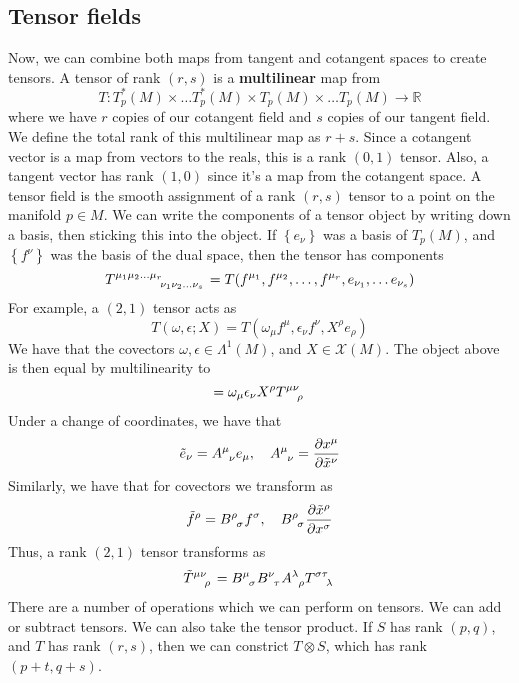 \documentclass[11pt, a4paper]{article}   	%
\theoremstyle{slplain}
\begin{document}
\subsection{Tensor fields} 
Now, we can combine both maps from tangent and cotangent spaces to create tensors. 
A tensor of rank $( r, s) $ is a \textbf{multilinear} map from 
\[
T: T_p^* ( M ) \times \dots T_p^*( M )  \times T_p(M) \times \dots T_p( M) \to  \mathbb{ R}  
\] where we have $r  $ copies of our cotangent field and $ s$ copies of our tangent field. 
We define the total rank of this multilinear map as $ r + s$. 
Since a cotangent vector is a map from vectors to the reals, 
this is a rank  $ ( 0, 1 ) $ tensor. 
Also, a tangent vector has rank $ ( 1, 0 ) $ since it's a map from the
cotangent space. 
A tensor field is the smooth assignment of a rank $ ( r, s) $ tensor to a point
on the manifold $ p \in M $. 
We can write the components of a tensor object 
by writing down a basis, then sticking this into the object. 
If $ \left\{  e_\nu \right\} $ was a basis of $ T_{p }( M ) $, and 
$ \left\{  f^\nu \right\} $ was the basis of the dual space, then 
the tensor has components 
\[
T \indices{^{\mu_1 } ^{\mu_2} ^{\dots } ^{\mu_r}_{\nu_1 }_{\nu_2 } _{\dots }_{\nu_s}} = T(f^{\mu_1 }, f^{\mu_2}, \dots, f^{\mu_r}, e_{\nu_1 }, \dots e_{\nu_s} )  
\]
For example, a $ ( 2 , 1) $ tensor acts as 
\[
T ( \omega , \epsilon; X) = T ( \omega_{\mu } f^\mu, \epsilon_{ \nu }f^\nu, X^\rho e_{ \rho }) 
\] We have that the covectors $ \omega  , \epsilon \in \Lambda^ 1 ( M ) $, and $  X\in \mathcal{ X }( M ) $. 
The object above is then equal by multilinearity to 
\[
= \omega _{ \mu } \epsilon_{\nu } X^\rho T \indices{ ^\mu ^ \nu _\rho }  
\] Under a change of coordinates, we have that 
\[
\tilde{ e}_{ \nu } = A \indices{^\mu _ \nu } e_{ \mu }, \quad A \indices{ ^ \mu _ \nu } = \frac{\partial  x^\mu }{\partial \tilde{ x}^\nu}   
\] 
Similarly, we have that for covectors we transform as 
\[
\tilde{ f} ^\rho = B \indices{ ^\rho _\sigma } f^\sigma, \quad B \indices{ ^\rho _\sigma } \frac{\partial  \tilde{ x}^\rho}{\partial x^\sigma}    
\] Thus, a rank $ ( 2, 1 ) $ tensor transforms as 
\[
\tilde{ T } \indices{^\mu^\nu_\rho}  = B \indices{^\mu_\sigma } B \indices{^\nu _\tau} A \indices{^\lambda _\rho} T \indices{^\sigma ^\tau _ \lambda}     
\] There are a number of operations which we can perform on tensors. 
We can add or subtract tensors. We can also take the tensor product. 
If $ S $ has rank $ ( p , q) $, and $  T $ has rank $ ( r, s ) $, then 
we can constrict $ T \otimes S $, which has rank $ ( p + t , q + s ) $. 
\end{document}
